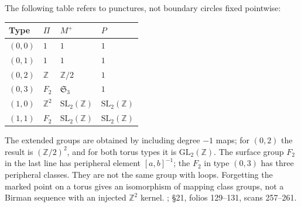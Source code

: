 The following table refers to punctures, not boundary circles fixed pointwise:
\begin{center}\small
\begin{tabular}{@{}llll@{}}\toprule
Type & $\Pi$ & $M^+$ & $P$\\\midrule
$(0,0)$ & $1$ & $1$ & $1$\\
$(0,1)$ & $1$ & $1$ & $1$\\
$(0,2)$ & $\mathbb Z$ & $\mathbb Z/2$ & $1$\\
$(0,3)$ & $F_2$ & $\mathfrak S_3$ & $1$\\
$(1,0)$ & $\mathbb Z^2$ & $\mathrm{SL}_2(\mathbb Z)$ & $\mathrm{SL}_2(\mathbb Z)$\\
$(1,1)$ & $F_2$ & $\mathrm{SL}_2(\mathbb Z)$ & $\mathrm{SL}_2(\mathbb Z)$\\\bottomrule
\end{tabular}
\end{center}
The extended groups are obtained by including degree $-1$ maps; for $(0,2)$ the result is $(\mathbb Z/2)^2$, and for both torus types it is $\mathrm{GL}_2(\mathbb Z)$. The surface group $F_2$ in the last line has peripheral element $[a,b]^{-1}$; the $F_2$ in type $(0,3)$ has three peripheral classes. They are not the same group with loops. Forgetting the marked point on a torus gives an isomorphism of mapping class groups, not a Birman sequence with an injected $\mathbb Z^2$ kernel.
; \S21, folios 129--131, scans 257--261.
